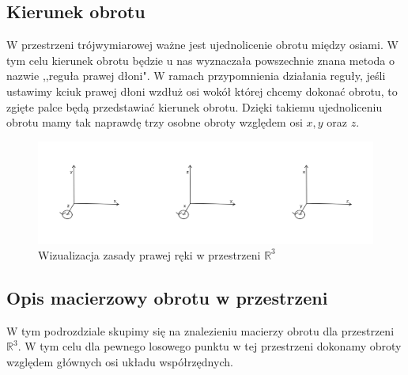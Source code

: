 \documentclass[a4paper,twoside,11pt,reqno]{mwrep}
\theoremstyle{plain} \newtheorem{twr}{Twierdzenie}
\theoremstyle{plain} \newtheorem{lem}{Lemat}
\theoremstyle{definition} \newtheorem{defi}{Definicja}
\theoremstyle{remark} \newtheorem*{wni}{Wniosek}
\theoremstyle{definition} \newtheorem{uwaga}{Uwaga}
\theoremstyle{definition}\newtheorem{prz}{Przykład}
\begin{document}
\subsection{Kierunek obrotu}

W przestrzeni trójwymiarowej ważne jest ujednolicenie obrotu między osiami.
W tym celu kierunek obrotu będzie u nas wyznaczała powszechnie znana metoda
o nazwie ,,reguła prawej dłoni". W ramach przypomnienia działania reguły, jeśli ustawimy
kciuk prawej dłoni wzdłuż osi wokół której chcemy
dokonać obrotu, to zgięte palce będą przedstawiać kierunek obrotu.
Dzięki takiemu ujednoliceniu obrotu mamy tak naprawdę trzy osobne obroty względem osi $x,y$
oraz $z$.

\begin{figure}[h]
\begin{center}
\includegraphics[width=15 cm]{zasPrawejReki.png}
\caption{Wizualizacja zasady prawej ręki w przestrzeni $\mathbb{R}^3$}
\end{center}
\end{figure}

\subsection{Opis macierzowy obrotu w przestrzeni}
W tym podrozdziale skupimy się na znalezieniu macierzy 
obrotu dla przestrzeni $\mathbb{R}^3$. W tym celu 
dla pewnego losowego punktu w tej przestrzeni dokonamy obroty względem głównych 
osi układu współrzędnych. 
\end{document}
